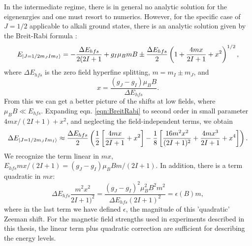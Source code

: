 In the intermediate regime, there is in general no analytic solution for the eigenenrgies and one must resort to numerics. However, for the specific case of $J=1/2$ applicable to alkali ground states, there is an analytic solution given by the Breit-Rabi formula \cite{BreitRabi}:
\begin{equation}
E_{\mathinner{|{J=1/2 m_J I m_I}\rangle}} = - \frac{\Delta E_{hfs}}{2(2I+1}+g_I \mu_B m B \pm \frac{\Delta E_{hfs}}{2}\left(1+\frac{4mx}{2I+1}+x^2\right)^{1/2},
\label{eqn:BreitRabi}
\end{equation}
where $\Delta E_{hfs}$ is the zero field hyperfine splitting, $m=m_I\pm m_J$, and
\begin{equation}
x=\frac{(g_J - g_I)\mu_B B}{\Delta E_{hfs}}.
\end{equation}
From this we can get a better picture of the shifts at low fields, where $\mu_B B\ll E_{hfs}$. Expanding eqn. \ref{eqn:BreitRabi} to second order in small parameter $4mx/(2I+1)+x^2$, and neglecting the field-independent terms, we obtain
\begin{equation}
\Delta E_{\mathinner{|{J=1/2 m_J I m_I}\rangle}}\approx \frac{\Delta E_{hfs}}{2}\left(\frac{1}{2}\left[\frac{4mx}{2I+1}+x^2\right]-\frac{1}{8}\left[\frac{16m^2 x^2}{(2I+1)^2} +\frac{4mx^3}{2I+1}+x^4\right]\right).
\end{equation}
We recognize the term linear in $mx$,  $E_{hfs}mx/(2I+1) = (g_J-g_I)\mu_B B m/(2I+1)$. In addition, there is a term quadratic in $mx$:
\begin{equation}
\Delta E_{hfs} \frac{m^2x^2}{2I+1)^2} = \frac{(g_J-g_I)^2 \mu_B^2 B^2 m^2}{\Delta E_{hfs} (2I+1)^2} = \epsilon(B) m,
\end{equation}
where in the last term we have defined $\epsilon$, the magnitude of this 'quadratic' Zeeman shift. For the magnetic field strengths used in experiments described in this thesis, the linear term plus quadratic correction are sufficient for describing the energy levels.
%
%	

